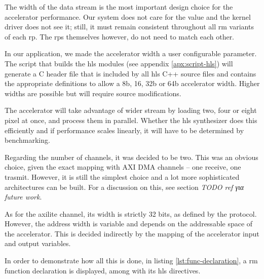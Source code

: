 The width of the data stream is the most important design choice for the accelerator performance.
Our system does not care for the value and the kernel driver does not see it; still,
it must remain consistent throughout all \gls{rm} variants of each \gls{rp}. The \glspl{rp} themselves
however, do not need to match each other.

In our application, we made the accelerator width a user configurable parameter. 
The script that builds the \gls{hls} modules (see appendix \ref{apx:script-hls}) 
will generate a C header file that is included by all \gls{hls} C++ source files
and contains the appropriate definitions to allow a 8b, 16, 32b or 64b accelerator width.
Higher widths are possible but will require source modifications.

The accelerator will take advantage of wider stream by loading two, four or eight pixel at once,
and process them in parallel. Whether the \gls{hls} synthesizer does this efficiently and 
if performance scales linearly, it will have to be determined by benchmarking.

Regarding the number of channels, it was decided to be two. This was an obvious choice,
given the exact mapping with AXI DMA channels -- one receive, one trasmit. 
However, it is still the simplest choice and a lot more sophisticated architectures
can be built. For a discussion on this, see section \emph{TODO ref για future work}.

As for the \gls{axilite} channel, its width is strictly 32 bits, as defined by the protocol.
However, the address width is variable and depends on the addressable space of the accelerator.
This is decided indirectly by the mapping of the accelerator input and output variables.

In order to demonstrate how all this is done, in listing \ref{lst:func-declaration},
a \gls{rm} function declaration is displayed, among with its \gls{hls} directives.

